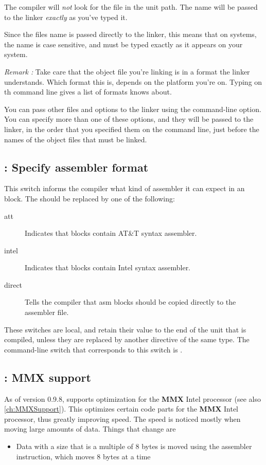 \documentclass{report}
\begin{document}
The compiler will {\em not} look for the file in the unit path. 
The name will be passed to the linker {\em exactly} as you've typed it.

Since the files name is passed directly to the linker, this means that on
\linux systems, the name is case sensitive, and must be typed exactly as it
appears on your system.

{\em Remark :} Take care that the object file you're linking is in a 
format the linker understands. Which format this is, depends on the platform
you're on. Typing  on th command line gives a list of formats
 knows about. 

You can pass other files and options to the linker using the 
command-line option. You can specify more than one of these options, and
they
will be passed to the linker, in the order that you specified them on the
command line, just before the names of the object files that must be linked.

\subsection{ : Specify assembler format}
This switch informs the compiler what kind of assembler it can expect in an
 block. The  should be replaced by one of the following:
\begin{description}
\item [att\ ] Indicates that  blocks contain AT\&T syntax assembler.
\item [intel\ ] Indicates that  blocks contain Intel syntax
assembler.
\item [direct\ ] Tells the compiler that asm blocks should be copied
directly to the assembler file.
\end{description}
These switches are local, and retain their value to the end of the unit that
is compiled, unless they are replaced by another directive of the same type.
The command-line switch that corresponds to this switch is . 


\subsection{ : MMX support}
As of version 0.9.8, \fpc supports optimization for the \textbf{MMX} Intel 
processor (see also \ref{ch:MMXSupport}). This optimizes certain code parts for the \textbf{MMX} Intel
processor, thus greatly improving speed. The speed is noticed mostly when
moving large amounts of data. Things that change are
\begin{itemize}
\item Data with a size that is a multiple of 8 bytes is moved using the 
 assembler instruction, which moves 8 bytes at a time
\end{itemize}
\end{document}
